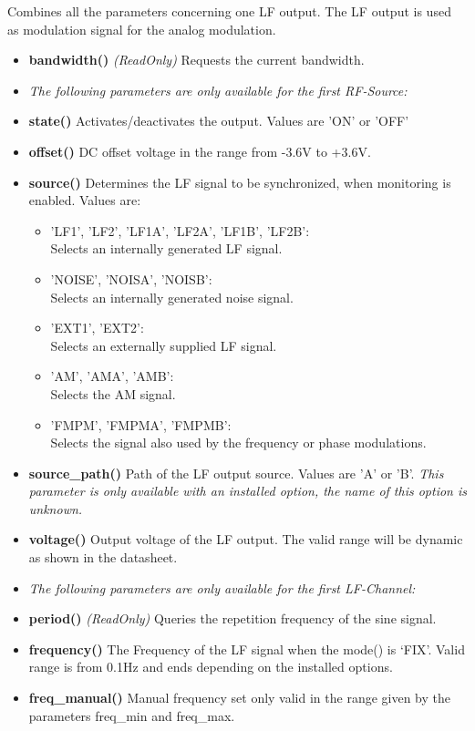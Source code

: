\documentclass[11pt]{article} %
\begin{document}
Combines all the parameters concerning one LF output. The LF output is used as modulation signal for the analog modulation.
\begin{itemize}
\item {\bf bandwidth()} {\it (ReadOnly)} Requests the current bandwidth.
\item[] {\it The following parameters are only available for the first RF-Source:}
\item {\bf state()} Activates/deactivates the output. Values are 'ON' or 'OFF'
\item {\bf offset()} DC offset voltage in the range from -3.6V to +3.6V.
\item {\bf source()} Determines the LF signal to be synchronized, when monitoring is enabled. Values are:
	\begin{itemize}[]
	\item 'LF1', 'LF2', 'LF1A', 'LF2A', 'LF1B', 'LF2B': \\
		Selects an internally generated LF signal.
	\item 'NOISE', 'NOISA', 'NOISB': \\
		Selects an internally generated noise signal.
	\item 'EXT1', 'EXT2': \\
		Selects an externally supplied LF signal.
	\item 'AM', 'AMA', 'AMB': \\
		Selects the AM signal.
	\item 'FMPM', 'FMPMA', 'FMPMB': \\
		Selects the signal also used by the frequency or phase modulations.
	\end{itemize}
\item {\bf source\_path()} Path of the LF output source. Values are 'A' or 'B'. {\it This parameter is only available with an installed option, the name of this option is unknown.}
\item {\bf voltage()} Output voltage of the LF output. The valid range will be dynamic as shown in the datasheet.
\item[] {\it The following parameters are only available for the first LF-Channel:}
\item {\bf period()} {\it (ReadOnly)} Queries the repetition frequency of the sine signal.
\item {\bf frequency()} The Frequency of the LF signal when the mode() is `FIX'. Valid range is from 0.1Hz and ends depending on the installed options.
\item {\bf freq\_manual()} Manual frequency set only valid in the range given by the parameters freq\_min and freq\_max.

\end{itemize}
\end{document}
